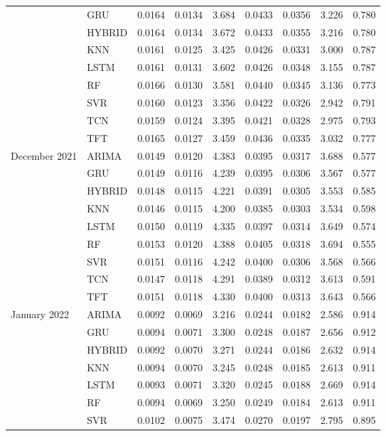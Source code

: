 \begin{tabular}{lllllllll}
 & GRU & 0.0164 & 0.0134 & 3.684 & 0.0433 & 0.0356 & 3.226 & 0.780 \\
 & HYBRID & 0.0164 & 0.0134 & 3.672 & 0.0433 & 0.0355 & 3.216 & 0.780 \\
 & KNN & 0.0161 & 0.0125 & 3.425 & 0.0426 & 0.0331 & 3.000 & 0.787 \\
 & LSTM & 0.0161 & 0.0131 & 3.602 & 0.0426 & 0.0348 & 3.155 & 0.787 \\
 & RF & 0.0166 & 0.0130 & 3.581 & 0.0440 & 0.0345 & 3.136 & 0.773 \\
 & SVR & 0.0160 & 0.0123 & 3.356 & 0.0422 & 0.0326 & 2.942 & 0.791 \\
 & TCN & 0.0159 & 0.0124 & 3.395 & 0.0421 & 0.0328 & 2.975 & 0.793 \\
 & TFT & 0.0165 & 0.0127 & 3.459 & 0.0436 & 0.0335 & 3.032 & 0.777 \\
December 2021 & ARIMA & 0.0149 & 0.0120 & 4.383 & 0.0395 & 0.0317 & 3.688 & 0.577 \\
 & GRU & 0.0149 & 0.0116 & 4.239 & 0.0395 & 0.0306 & 3.567 & 0.577 \\
 & HYBRID & 0.0148 & 0.0115 & 4.221 & 0.0391 & 0.0305 & 3.553 & 0.585 \\
 & KNN & 0.0146 & 0.0115 & 4.200 & 0.0385 & 0.0303 & 3.534 & 0.598 \\
 & LSTM & 0.0150 & 0.0119 & 4.335 & 0.0397 & 0.0314 & 3.649 & 0.574 \\
 & RF & 0.0153 & 0.0120 & 4.388 & 0.0405 & 0.0318 & 3.694 & 0.555 \\
 & SVR & 0.0151 & 0.0116 & 4.242 & 0.0400 & 0.0306 & 3.568 & 0.566 \\
 & TCN & 0.0147 & 0.0118 & 4.291 & 0.0389 & 0.0312 & 3.613 & 0.591 \\
 & TFT & 0.0151 & 0.0118 & 4.330 & 0.0400 & 0.0313 & 3.643 & 0.566 \\
January 2022 & ARIMA & 0.0092 & 0.0069 & 3.216 & 0.0244 & 0.0182 & 2.586 & 0.914 \\
 & GRU & 0.0094 & 0.0071 & 3.300 & 0.0248 & 0.0187 & 2.656 & 0.912 \\
 & HYBRID & 0.0092 & 0.0070 & 3.271 & 0.0244 & 0.0186 & 2.632 & 0.914 \\
 & KNN & 0.0094 & 0.0070 & 3.245 & 0.0248 & 0.0185 & 2.613 & 0.911 \\
 & LSTM & 0.0093 & 0.0071 & 3.320 & 0.0245 & 0.0188 & 2.669 & 0.914 \\
 & RF & 0.0094 & 0.0069 & 3.250 & 0.0249 & 0.0184 & 2.613 & 0.911 \\
 & SVR & 0.0102 & 0.0075 & 3.474 & 0.0270 & 0.0197 & 2.795 & 0.895 \\

\end{tabular}
